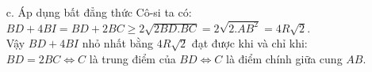 \begin{ex}
{\begin{enumerate}
        $\circ$ $\widehat{BIO}=\widehat{KID}=90^\circ$.\\
        $\circ$ $\widehat{IBO}=\widehat{IKD}$ (cùng phụ với $\widehat{IDK}$).\\
        Suy ra: $\Delta IBO\backsim\Delta IKD$ (g-g) $\Rightarrow \dfrac{IB}{IK}=\dfrac{IO}{ID}\Leftrightarrow IB.ID=IO.IK$.
        \item[c.] Áp dụng bất đẳng thức Cô-si ta có:\\
        $BD+4BI=BD+2BC\ge 2\sqrt{2BD.BC}=2\sqrt{2.AB^2}=4R\sqrt{2}$.\\
        Vậy $BD+4BI$ nhỏ nhất bằng $4R\sqrt{2}$ đạt được khi và chỉ khi:\\
        $BD=2BC\Leftrightarrow C$ là trung điểm của $BD\Leftrightarrow C$ là điểm chính giữa cung $AB$. 
    \end{enumerate}
    }
\end{ex}
